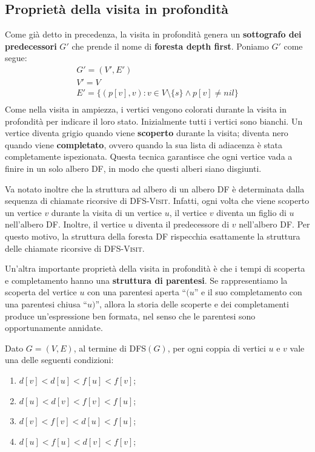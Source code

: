 \subsection{Proprietà della visita in profondità}\label{sez:prop_dfs}
Come già detto in precedenza, la visita in profondità genera un \textbf{sottografo dei predecessori} $G'$ che prende il nome di \textbf{foresta depth first}. Poniamo $G'$ come segue:
\begin{displaymath}
	\begin{array}{l}
		G' = (V', E') \\
		V' = V \\
		E' = \{(p[v],v):v \in V \setminus \{s\} \land p[v] \neq nil\}\\
	\end{array}
\end{displaymath}
Come nella visita in ampiezza, i vertici vengono colorati durante la visita in profondità per indicare il loro stato. Inizialmente tutti i vertici sono bianchi. Un vertice diventa grigio quando viene \textbf{scoperto} durante la visita; diventa nero quando viene \textbf{completato}, ovvero quando la sua lista di adiacenza è stata completamente ispezionata. Questa tecnica garantisce che ogni vertice vada a finire in un solo albero DF, in modo che questi alberi siano disgiunti.

Va notato inoltre che la struttura ad albero di un albero DF è determinata dalla sequenza di chiamate ricorsive di \textsc{DFS-Visit}. Infatti, ogni volta che viene scoperto un vertice $v$ durante la visita di un vertice $u$, il vertice $v$ diventa un figlio di $u$ nell'albero DF. Inoltre, il vertice $u$ diventa il predecessore di $v$ nell'albero DF. Per questo motivo, la struttura della foresta DF rispecchia esattamente la struttura delle chiamate ricorsive di \textsc{DFS-Visit}.

Un'altra importante proprietà della visita in profondità è che i tempi di scoperta e completamento hanno una \textbf{struttura di parentesi}. Se rappresentiamo la scoperta del vertice $u$ con una parentesi aperta ``$(u$'' e il suo completamento con una parentesi chiusa ``$u)$'', allora la storia delle scoperte e dei completamenti produce un'espressione ben formata, nel senso che le parentesi sono opportunamente annidate.


\begin{teorbox}
	Dato $G=(V,E)$, al termine di \textsc{DFS}$(G)$, per ogni coppia di vertici $u$ e $v$ vale una delle seguenti condizioni:
	\begin{enumerate}
		\item $d[v] < d[u] < f[u] < f[v]$;
		\item $d[u] < d[v] < f[v] < f[u]$;
		\item $d[v] < f[v] < d[u] < f[u]$;
		\item $d[u] < f[u] < d[v] < f[v]$;
	\end{enumerate}
\end{teorbox}

